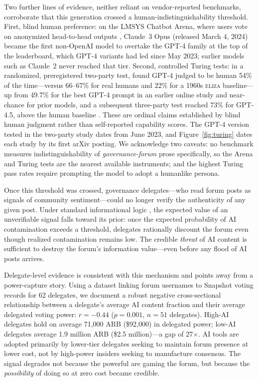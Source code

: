 \documentclass[12pt]{article}
\begin{document}
Two further lines of evidence, neither reliant on vendor-reported benchmarks, corroborate that this generation crossed a human-indistinguishability threshold. First, blind human preference: on the LMSYS Chatbot Arena, where users vote on anonymized head-to-head outputs \citep{zheng2023}, Claude~3 Opus (released March 4, 2024) became the first non-OpenAI model to overtake the GPT-4 family at the top of the leaderboard, which GPT-4 variants had led since May 2023; earlier models such as Claude~2 never reached that tier. Second, controlled Turing tests: in a randomized, preregistered two-party test, \citet{jones2024turing} found GPT-4 judged to be human 54\% of the time---versus 66--67\% for real humans and 22\% for a 1960s \textsc{eliza} baseline---up from 49.7\% for the best GPT-4 prompt in an earlier online study \citep{jones2023turing} and near-chance for prior models, and a subsequent three-party test reached 73\% for GPT-4.5, above the human baseline \citep{jones2025turing}. These are ordinal claims established by blind human judgment rather than self-reported capability scores. The GPT-4 version tested in the two-party study dates from June 2023, and Figure~\ref{fig:turing} dates each study by its first arXiv posting. We acknowledge two caveats: no benchmark measures indistinguishability of \emph{governance-forum} prose specifically, so the Arena and Turing tests are the nearest available instruments; and the highest Turing pass rates require prompting the model to adopt a humanlike persona.

Once this threshold was crossed,
governance delegates---who read forum posts as signals of community sentiment---could
no longer verify the authenticity of any given post. Under standard informational
logic \citep{grossman1980}, the expected value of an unverifiable signal falls toward
its prior: once the expected probability of AI contamination exceeds a threshold,
delegates rationally discount the forum even though realized contamination remains
low. The credible \emph{threat} of AI content is sufficient to destroy the forum's
information value---even before any flood of AI posts arrives.

Delegate-level evidence is consistent with this mechanism and points away from a power-capture
story. Using a dataset linking forum usernames to Snapshot voting
records for 62 delegates, we document a robust negative cross-sectional relationship
between a delegate's average AI content fraction and their average delegated voting
power: $r = -0.44$ ($p = 0.001$, $n = 51$ delegates). High-AI delegates hold on
average 71,000 ARB (\$92{,}000) in delegated power; low-AI delegates average 1.9 million ARB (\$2.5 million)---a
gap of 27$\times$. AI tools are adopted primarily by lower-tier delegates seeking
to maintain forum presence at lower cost, not by high-power insiders seeking to
manufacture consensus. The signal degrades not because the powerful are gaming the
forum, but because the \emph{possibility} of doing so at zero cost became credible.
\end{document}
